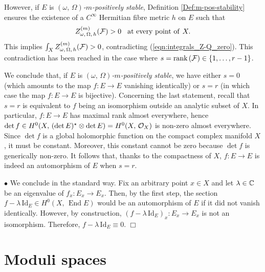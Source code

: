 \documentclass[12pt]{article}
\begin{document}
  However, if $E$ is {\it $(\omega,\,\Omega)$-$m$-positively stable}, Definition \ref{Def:m-pos-stability} ensures the existence of a $C^\infty$ Hermitian fibre metric $h$ on $E$ such that \begin{eqnarray*}Z_{\omega,\,\Omega,\,h}^{(m)}({\cal F})> 0 \hspace{2ex} \mbox{at every point of}\hspace{1ex} X.\end{eqnarray*} This implies $\int_X Z_{\omega,\,\Omega,\,h}^{(m)}({\cal F})>0$, contradicting (\ref{eqn:integrals_Z-Q_zero}). This contradiction has been reached in the case where $s=\mbox{rank}\,({\cal F})\in\{1,\dots , r-1\}$.

  We conclude that, if $E$ is {\it $(\omega,\,\Omega)$-$m$-positively stable}, we have either $s=0$ (which amounts to the map $f:E\to E$ vanishing identically) or $s=r$ (in which case the map $f:E\to E$ is bijective). Concerning the last statement, recall that $s=r$ is equivalent to $f$ being an isomorphism outside an analytic subset of $X$. In particular, $f:E\to E$ has maximal rank almost everywhere, hence $\det f\in H^0(X,\,(\det E)^\star\otimes\det E) =H^0(X,\,{\cal O}_X)$ is non-zero almost everywhere. Since $\det f$ is a global holomorphic function on the compact complex manifold $X$, it must be constant. Moreover, this constant cannot be zero because $\det f$ is generically non-zero. It follows that, thanks to the compactness of $X$, $f:E\to E$ is indeed an automorphism of $E$ when $s=r$.  

\vspace{1ex}

  $\bullet$ We conclude in the standard way. Fix an arbitrary point $x\in X$ and let $\lambda\in\mathbb{C}$ be an eigenvalue of $f_x:E_x\longrightarrow E_x$. Then, by the first step, the section $f-\lambda\,\mbox{Id}_E\in H^0(X,\,\operatorname{End} E)$ would be an automorphism of $E$ if it did not vanish identically. However, by construction, $(f-\lambda\,\mbox{Id}_E)_x:E_x\longrightarrow E_x$ is not an isomorphism. Therefore, $f-\lambda\,\mbox{Id}_E\equiv 0$.  \hfill $\Box$  

\section{Moduli spaces}\label{section:moduli}
\end{document}
